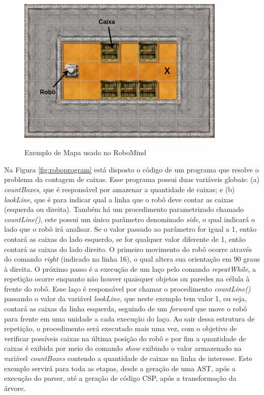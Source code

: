 \begin{figure}[h]
\centering
\caption{Exemplo de Mapa usado no RoboMind}
\includegraphics[height=7cm]{figuras/map2.png}
\label{fig:map}
\end{figure}

Na Figura \ref{fig:roboprogram} está disposto o código de um programa que resolve o problema da contagem de caixas. Esse programa possui duas variáveis globais: (a) \textit{countBoxes}, que é responsável por amazenar a quantidade de caixas; e (b) \textit{lookLine}, que é para indicar qual a linha que o robô deve contar as caixas (esquerda ou direita). Também há um procedimento parametrizado chamado \textit{countLine()}, este possui um único parâmetro denominado \textit{side}, o qual indicará o lado que o robô irá analisar. Se o valor passado ao parâmetro for igual a 1, então contará as caixas do lado esquerdo, se for qualquer valor diferente de 1, então contará as caixas do lado direito. O primeiro movimento do robô ocorre através do comando \textit{right} (indicado na linha 16), o qual altera sua orientação em 90 graus à direita. O próximo passo é a execução de um laço pelo comando \textit{repeatWhile}, a repetição ocorre enquanto não houver quaisquer objetos ou paredes na célula à frente do robô. Esse laço é responsável por chamar o procedimento \textit{countLine()} passando o valor da variável \textit{lookLine}, que neste exemplo tem valor 1, ou seja, contará as caixas da linha esquerda, seguindo de um \textit{forward} que move o robô para frente em uma unidade a cada execução do laço. Ao sair dessa estrutura de repetição, o procedimento será executado mais uma vez, com o objetivo de verificar possíveis caixas na última posição do robô e por fim a quantidade de caixas é exibida por meio do comando \textit{show} exibindo o valor armazenado na variável \textit{countBoxes} contendo a quantidade de caixas na linha de interesse. Este exemplo servirá para toda as etapas, desde a geração de uma AST, após a execução do parser, até a geração de código CSP, após a transformação da árvore.

